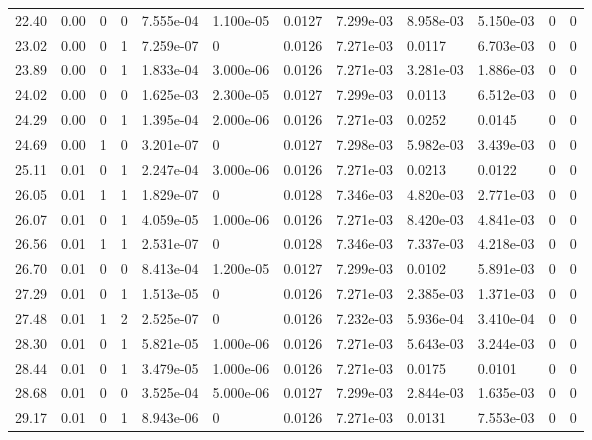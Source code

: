\documentclass[preview]{standalone}
\begin{document}
{{{\begin{tabular}{L{1.2cm}C{1.2cm} C{0.3cm}C{0.5cm} C{1.4cm}C{1.4cm} C{1.4cm}C{1.4cm} C{1.6cm}C{1.6cm} C{1.6cm}C{1.6cm}}
  22.40  &  0.00  & 0     &  0 &  7.555e-04  & 1.100e-05  &  0.0127&   7.299e-03& 8.958e-03 & 5.150e-03   &  0 & 0  \\ 
  23.02  &  0.00  & 0     &  1 &  7.259e-07  & 0  &  0.0126&   7.271e-03& 0.0117 & 6.703e-03   &  0 & 0  \\ 
  23.89  &  0.00  & 0     &  1 &  1.833e-04  & 3.000e-06  &  0.0126&   7.271e-03& 3.281e-03 & 1.886e-03   &  0 & 0  \\ 
  24.02  &  0.00  & 0     &  0 &  1.625e-03  & 2.300e-05  &  0.0127&   7.299e-03& 0.0113 & 6.512e-03   &  0 & 0  \\ 
  24.29  &  0.00  & 0     &  1 &  1.395e-04  & 2.000e-06  &  0.0126&   7.271e-03& 0.0252 & 0.0145   &  0 & 0  \\ 
  24.69  &  0.00  & 1     &  0 &  3.201e-07  & 0  &  0.0127&   7.298e-03& 5.982e-03 & 3.439e-03   &  0 & 0  \\ 
  25.11  &  0.01  & 0     &  1 &  2.247e-04  & 3.000e-06  &  0.0126&   7.271e-03& 0.0213 & 0.0122   &  0 & 0  \\ 
  26.05  &  0.01  & 1     &  1 &  1.829e-07  & 0  &  0.0128&   7.346e-03& 4.820e-03 & 2.771e-03   &  0 & 0  \\ 
  26.07  &  0.01  & 0     &  1 &  4.059e-05  & 1.000e-06  &  0.0126&   7.271e-03& 8.420e-03 & 4.841e-03   &  0 & 0  \\ 
  26.56  &  0.01  & 1     &  1 &  2.531e-07  & 0  &  0.0128&   7.346e-03& 7.337e-03 & 4.218e-03   &  0 & 0  \\ 
  26.70  &  0.01  & 0     &  0 &  8.413e-04  & 1.200e-05  &  0.0127&   7.299e-03& 0.0102 & 5.891e-03   &  0 & 0  \\ 
  27.29  &  0.01  & 0     &  1 &  1.513e-05  & 0  &  0.0126&   7.271e-03& 2.385e-03 & 1.371e-03   &  0 & 0  \\ 
  27.48  &  0.01  & 1     &  2 &  2.525e-07  & 0  &  0.0126&   7.232e-03& 5.936e-04 & 3.410e-04   &  0 & 0  \\ 
  28.30  &  0.01  & 0     &  1 &  5.821e-05  & 1.000e-06  &  0.0126&   7.271e-03& 5.643e-03 & 3.244e-03   &  0 & 0  \\ 
  28.44  &  0.01  & 0     &  1 &  3.479e-05  & 1.000e-06  &  0.0126&   7.271e-03& 0.0175 & 0.0101   &  0 & 0  \\ 
  28.68  &  0.01  & 0     &  0 &  3.525e-04  & 5.000e-06  &  0.0127&   7.299e-03& 2.844e-03 & 1.635e-03   &  0 & 0  \\ 
  29.17  &  0.01  & 0     &  1 &  8.943e-06  & 0  &  0.0126&   7.271e-03& 0.0131 & 7.553e-03   &  0 & 0  \\ 

\end{tabular}}}}
\end{document}

